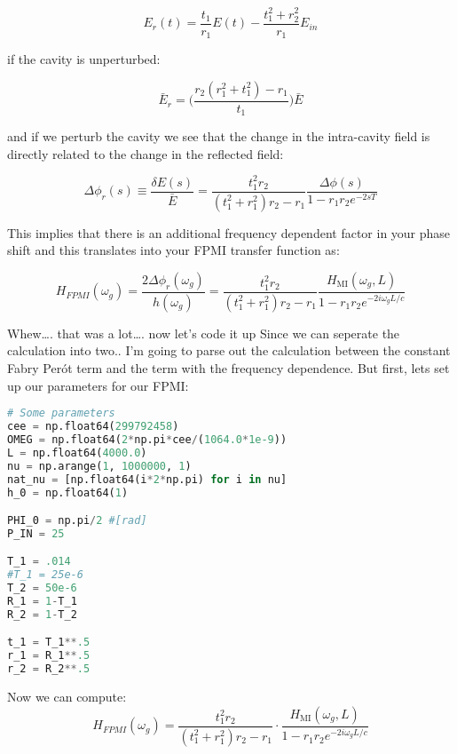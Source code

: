 \begin{equation} E_r(t) = \frac{t_1}{r_1}E(t) - \frac{t_1^2 + r_2^2}{r_1} E_{in}\end{equation}

if the cavity is unperturbed:

\begin{equation} \bar{E}_r = \bigg(\frac{r_2(r_1^2 + t_1^2) - r_1}{t_1} \bigg) \bar{E} \end{equation}

and if we perturb the cavity we see that the change in the intra-cavity
field is directly related to the change in the reflected field:

\begin{equation} \Delta \phi_r(s) \equiv \frac{\delta E(s)}{\bar{E}} = \frac{t_1^2r_2}{(t_1^2 + r_1^2)r_2 -r_1} \frac{\Delta \phi(s)}{1-r_1r_2e^{-2sT}}\end{equation}

This implies that there is an additional frequency dependent factor in
your phase shift and this translates into your FPMI transfer function
as:

\begin{equation} H_{FPMI}(\omega_g) = \frac{2 \Delta \phi_r(\omega_g)}{h(\omega_g)} =  \frac{t_1^2r_2}{(t_1^2 + r_1^2)r_2 -r_1} \frac{H_{\mathrm{MI}}(\omega_g, L)}{1-r_1r_2e^{-2i \omega_g L /c }}  \end{equation}

Whew\ldots. that was a lot\ldots. now let's code it up Since we can
seperate the calculation into two.. I'm going to parse out the
calculation between the constant Fabry Perót term and the term with the
frequency dependence. But first, lets set up our parameters for our
FPMI:

\begin{spacing}{1} \begin{lstlisting}[frame=single, language=Python]
# Some parameters
cee = np.float64(299792458)
OMEG = np.float64(2*np.pi*cee/(1064.0*1e-9))
L = np.float64(4000.0)
nu = np.arange(1, 1000000, 1)
nat_nu = [np.float64(i*2*np.pi) for i in nu]
h_0 = np.float64(1)

PHI_0 = np.pi/2 #[rad]
P_IN = 25

T_1 = .014
#T_1 = 25e-6 
T_2 = 50e-6
R_1 = 1-T_1
R_2 = 1-T_2

t_1 = T_1**.5
r_1 = R_1**.5
r_2 = R_2**.5
\end{lstlisting} \end{spacing}

Now we can compute:
\begin{equation} H_{FPMI}(\omega_g) =  \frac{t_1^2r_2}{(t_1^2 + r_1^2)r_2 -r_1}\cdot \frac{H_{\mathrm{MI}}(\omega_g, L)}{1-r_1r_2e^{-2i \omega_g L /c }}  \end{equation}


